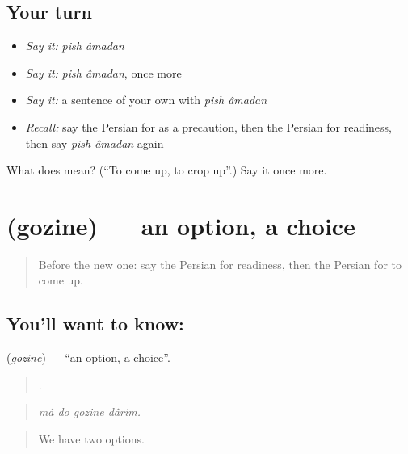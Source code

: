 \subsection*{Your turn}
\begin{itemize}
\raggedright
  \item \emph{Say it:} \emph{pish âmadan}
  \item \emph{Say it:} \emph{pish âmadan}, once more
  \item \emph{Say it:} a sentence of your own with \emph{pish âmadan}
  \item \emph{Recall:} say the Persian for as a precaution, then the Persian for readiness, then say \emph{pish âmadan} again
\end{itemize}

\begin{tcolorbox}[breakable,colback=teal!4,colframe=teal!35!black,title={Before you move on}]
What does   mean? (\textquotedblleft{}To come up, to crop up\textquotedblright{}.) Say it once more.
\end{tcolorbox}
\section[\texorpdfstring{\fa{گزینه} (gozine)}{گزینه (gozine)}]{ (gozine) — an option, a choice}

\label{lesson:FA-C397-gozine}



\begin{quote}
Before the new one: say the Persian for readiness, then the Persian for to come up.
\end{quote}

\subsection*{You'll want to know: }
\textbf{} (\emph{gozine}) — \textquotedblleft{}an option, a choice\textquotedblright{}.

\begin{quote}
   .
\end{quote}

\begin{quote}
\emph{mâ do gozine dârim.}
\end{quote}

\begin{quote}
We have two options.
\end{quote}

